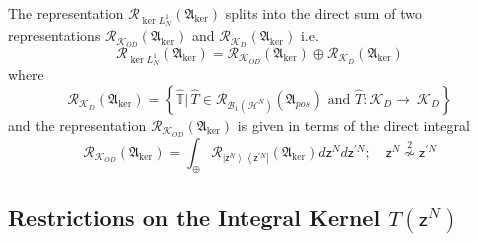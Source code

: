 \documentclass[aps,preprint]{revtex4}%
\begin{document}
The representation $\mathcal{R}_{\ker L_{N}^{1}}\left(  \mathfrak{A}_{\ker
}\right)  $ splits into the direct sum of two representations $\mathcal{R}%
_{\mathcal{K}_{OD}}\left(  \mathfrak{A}_{\ker}\right)  $ and $\mathcal{R}%
_{\mathcal{K}_{D}}\left(  \mathfrak{A}_{\ker}\right)  $ i.e.
\begin{equation}
\mathcal{R}_{\ker L_{N}^{1}}\left(  \mathfrak{A}_{\ker}\right)  =\mathcal{R}%
_{\mathcal{K}_{OD}}\left(  \mathfrak{A}_{\ker}\right)  \oplus\mathcal{R}%
_{\mathcal{K}_{D}}\left(  \mathfrak{A}_{\ker}\right)
\end{equation}
where
\begin{equation}
\mathcal{R}_{\mathcal{K}_{D}}\left(  \mathfrak{A}_{\ker}\right)  =\left\{
\mathbb{\hat{T}}|\,\hat{T}\in\mathcal{R}_{\mathcal{B}_{1}\left(
\mathcal{H}^{N}\right)  }\left(  \mathfrak{A}_{pos}\right)  \text{ and }%
\hat{T}:\mathcal{K}_{D}\rightarrow\ \mathcal{K}_{D}\right\}
\end{equation}
and the representation $\mathcal{R}_{\mathcal{K}_{OD}}\left(  \mathfrak{A}%
_{\ker}\right)  $ is given in terms of the direct integral%
\begin{equation}
\mathcal{R}_{\mathcal{K}_{OD}}\left(  \mathfrak{A}_{\ker}\right)
=\int_{\oplus}\mathcal{R}_{\left\vert \mathsf{z}^{N}\right\rangle \left\langle
\mathsf{z}^{\prime N}\right\vert }\left(  \mathfrak{A}_{\ker}\right)
d\mathsf{z}^{N}d\mathsf{z}^{\prime N};\quad\mathsf{z}^{N}\overset{2}{\nsim
}\mathsf{z}^{\prime N}%
\end{equation}


\subsection{Restrictions on the Integral Kernel $T\left(  \mathsf{z}%
^{N}\right)  $}
\end{document}
